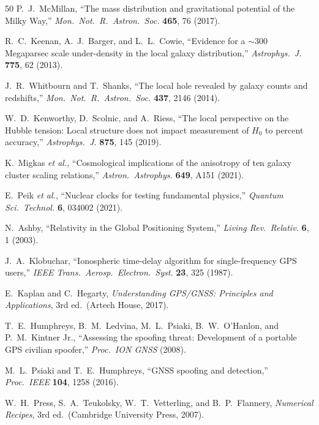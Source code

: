 \documentclass[aps,prd,twocolumn,superscriptaddress,nofootinbib,longbibliography]{revtex4-2}
\begin{document}
\begin{thebibliography}{50}
P.~J.~McMillan,
``The mass distribution and gravitational potential of the Milky Way,''
\textit{Mon.\ Not.\ R.\ Astron.\ Soc.} \textbf{465}, 76 (2017).

R.~C.~Keenan, A.~J.~Barger, and L.~L.~Cowie,
``Evidence for a $\sim$300 Megaparsec scale under-density in the local
galaxy distribution,''
\textit{Astrophys.\ J.} \textbf{775}, 62 (2013).

J.~R.~Whitbourn and T.~Shanks,
``The local hole revealed by galaxy counts and redshifts,''
\textit{Mon.\ Not.\ R.\ Astron.\ Soc.} \textbf{437}, 2146 (2014).

W.~D.~Kenworthy, D.~Scolnic, and A.~Riess,
``The local perspective on the Hubble tension: Local structure does not
impact measurement of $H_0$ to percent accuracy,''
\textit{Astrophys.\ J.} \textbf{875}, 145 (2019).

K.~Migkas \textit{et al.},
``Cosmological implications of the anisotropy of ten galaxy cluster
scaling relations,''
\textit{Astron.\ Astrophys.} \textbf{649}, A151 (2021).

E.~Peik \textit{et al.},
``Nuclear clocks for testing fundamental physics,''
\textit{Quantum Sci.\ Technol.} \textbf{6}, 034002 (2021).

N.~Ashby,
``Relativity in the Global Positioning System,''
\textit{Living Rev.\ Relativ.} \textbf{6}, 1 (2003).

J.~A.~Klobuchar,
``Ionospheric time-delay algorithm for single-frequency GPS users,''
\textit{IEEE Trans.\ Aerosp.\ Electron.\ Syst.} \textbf{23}, 325 (1987).

E.~Kaplan and C.~Hegarty,
\textit{Understanding GPS/GNSS: Principles and Applications}, 3rd ed.\
(Artech House, 2017).

T.~E.~Humphreys, B.~M.~Ledvina, M.~L.~Psiaki, B.~W.~O'Hanlon, and
P.~M.~Kintner Jr.,
``Assessing the spoofing threat: Development of a portable GPS civilian
spoofer,''
\textit{Proc.\ ION GNSS} (2008).

M.~L.~Psiaki and T.~E.~Humphreys,
``GNSS spoofing and detection,''
\textit{Proc.\ IEEE} \textbf{104}, 1258 (2016).

W.~H.~Press, S.~A.~Teukolsky, W.~T.~Vetterling, and B.~P.~Flannery,
\textit{Numerical Recipes}, 3rd ed.\ (Cambridge University Press, 2007).


\end{thebibliography}
\end{document}
